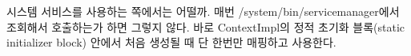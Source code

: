 시스템 서비스를 사용하는 쪽에서는 어떨까. 매번 /system/bin/servicemanager에서 조회해서 호출하는가 하면 그렇지 않다.
바로 ContextImpl의 정적 초기화 블록(static initializer block) 안에서 처음 생성될 때 단 한번만 매핑하고 사용한다.
